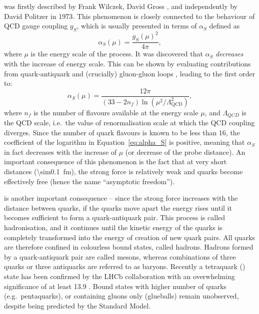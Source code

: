 \begin{description}[wide=\parindent]
\item [Asymptotic freedom] was firstly described by Frank Wilczek, David Gross \autocite{Gross_Wilczek}, and
independently by David Politzer \autocite{Politzer} in 1973. This phenomenon is closely connected to the behaviour of
QCD gauge coupling $g_S$, which is usually presented in terms of $\alpha_S$ defined as
\begin{equation}
\alpha_S (\mu) = \frac{g_S (\mu)^2}{4 \pi},
\end{equation}
where $\mu$ is the energy scale of the process. It was discovered that $\alpha_S$ \textit{decreases} with the increase
of energy scale. This can be shown by evaluating contributions from quark-antiquark and (crucially) gluon-gluon loops
\autocite{Griffiths}, leading to the first order to:
\begin{equation}
\alpha_S (\mu) = \frac{12\pi}{(33-2n_f) \ln(\mu^2/\Lambda_{\text{QCD}}^2)},
\label{eq:alpha_S}
\end{equation}
where $n_f$ is the number of flavours available at the energy scale $\mu$, and $\Lambda_{QCD}$ is the QCD scale, i.e.\
the value of renormalisation scale at which the QCD coupling diverges. Since the number of quark flavours is known to be
less than 16, the coefficient of the logarithm in Equation~\ref{eq:alpha_S} is positive, meaning that $\alpha_S$ in fact
decreases with the increase of $\mu$ (or decrease of the probe distance). An important consequence of this phenomenon is
the fact that at very short distances (\SI{\sim0.1}{\femto\metre}), the strong force is relatively weak and quarks
become effectively free (hence the name ``asymptotic freedom'').

\item [Colour confinement] is another important consequence -- since the strong force increases with the distance
between quarks, if the quarks move apart the energy rises until it becomes sufficient to form a quark-antiquark pair.
This process is called hadronisation, and it continues until the kinetic energy of the quarks is completely transformed
into the energy of creation of new quark pairs. All quarks are therefore confined in colourless bound states, called
hadrons. Hadrons formed by a quark-antiquark pair are called mesons, whereas combinations of three quarks or three
antiquarks are referred to as baryons. Recently a tetraquark (\cPqc\cPaqc\cPqd\cPaqu) state has been confirmed by the
LHCb collaboration with an overwhelming significance of at least \SI{13.9}{\sigma} \autocite{tetraquark_LHCb}. Bound
states with higher number of quarks (e.g.\ pentaquarks), or containing gluons only (glueballs) remain unobserved,
despite being predicted by the Standard Model.

\end{description}

